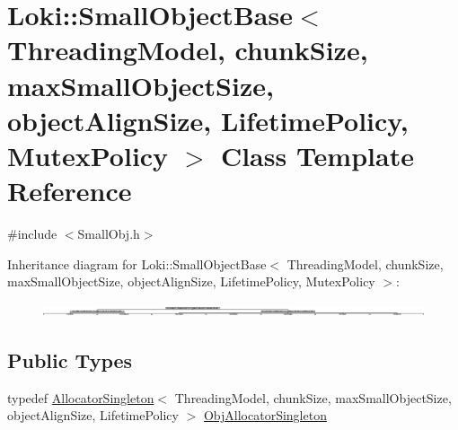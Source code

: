 \hypertarget{classLoki_1_1SmallObjectBase}{}\section{Loki\+:\+:Small\+Object\+Base$<$ Threading\+Model, chunk\+Size, max\+Small\+Object\+Size, object\+Align\+Size, Lifetime\+Policy, Mutex\+Policy $>$ Class Template Reference}
\label{classLoki_1_1SmallObjectBase}


{\ttfamily \#include $<$Small\+Obj.\+h$>$}

Inheritance diagram for Loki\+:\+:Small\+Object\+Base$<$ Threading\+Model, chunk\+Size, max\+Small\+Object\+Size, object\+Align\+Size, Lifetime\+Policy, Mutex\+Policy $>$\+:\begin{figure}[H]
\begin{center}
\leavevmode
\includegraphics[height=0.335664cm]{classLoki_1_1SmallObjectBase}
\end{center}
\end{figure}
\subsection*{Public Types}
\begin{DoxyCompactItemize}
\item 
typedef \hyperlink{classLoki_1_1AllocatorSingleton}{Allocator\+Singleton}$<$ Threading\+Model, chunk\+Size, max\+Small\+Object\+Size, object\+Align\+Size, Lifetime\+Policy $>$ \hyperlink{classLoki_1_1SmallObjectBase_ad07df1c9ec9c41580e07e32eddcda82d}{Obj\+Allocator\+Singleton}
\end{DoxyCompactItemize}

